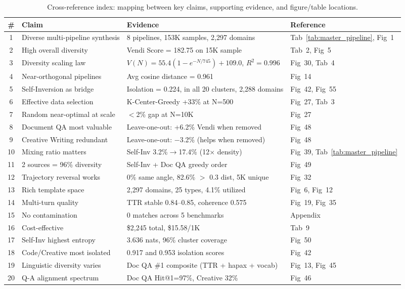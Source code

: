 \begin{table}[t]
\centering
\caption{Cross-reference index: mapping between key claims, supporting evidence, and figure/table locations.}
\label{tab:crossref}
\scriptsize
\setlength{\tabcolsep}{3pt}
\begin{tabular}{clll}
\toprule
\textbf{\#} & \textbf{Claim} & \textbf{Evidence} & \textbf{Reference} \\
\midrule
1 & Diverse multi-pipeline synthesis & 8 pipelines, 153K samples, 2,297 domains & Tab~\ref{tab:master_pipeline}, Fig~1 \\
2 & High overall diversity & Vendi Score = 182.75 on 15K sample & Tab~2, Fig~5 \\
3 & Diversity scaling law & $V(N) = 55.4(1-e^{-N/745}) + 109.0$, $R^2=0.996$ & Fig~30, Tab~4 \\
4 & Near-orthogonal pipelines & Avg cosine distance = 0.961 & Fig~14 \\
5 & Self-Inversion as bridge & Isolation = 0.224, in all 20 clusters, 2,288 domains & Fig~42, Fig~55 \\
6 & Effective data selection & K-Center-Greedy +33\% at N=500 & Fig~27, Tab~3 \\
7 & Random near-optimal at scale & $<$2\% gap at N=10K & Fig~27 \\
8 & Document QA most valuable & Leave-one-out: +6.2\% Vendi when removed & Fig~48 \\
9 & Creative Writing redundant & Leave-one-out: $-$3.2\% (helps when removed) & Fig~48 \\
10 & Mixing ratio matters & Self-Inv 3.2\%$\rightarrow$17.4\% (12$\times$ density) & Fig~39, Tab~\ref{tab:master_pipeline} \\
11 & 2 sources = 96\% diversity & Self-Inv + Doc QA greedy order & Fig~49 \\
12 & Trajectory reversal works & 0\% same angle, 82.6\% $>$ 0.3 dist, 5K unique & Fig~32 \\
13 & Rich template space & 2,297 domains, 25 types, 4.1\% utilized & Fig~6, Fig~12 \\
14 & Multi-turn quality & TTR stable 0.84--0.85, coherence 0.575 & Fig~19, Fig~35 \\
15 & No contamination & 0 matches across 5 benchmarks & Appendix \\
16 & Cost-effective & \$2,245 total, \$15.58/1K & Tab~9 \\
17 & Self-Inv highest entropy & 3.636 nats, 96\% cluster coverage & Fig~50 \\
18 & Code/Creative most isolated & 0.917 and 0.953 isolation scores & Fig~42 \\
19 & Linguistic diversity varies & Doc QA \#1 composite (TTR + hapax + vocab) & Fig~13, Fig~45 \\
20 & Q-A alignment spectrum & Doc QA Hit@1=97\%, Creative 32\% & Fig~46 \\
\bottomrule
\end{tabular}
\end{table}